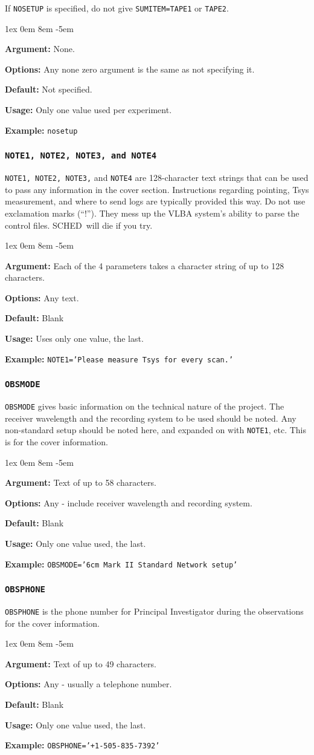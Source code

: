 \documentclass{report}
\newcommand{\schedb}{{\sc SCHED~}}
\newcommand{\rcwbox}[5]{
  \begin{list}{}{\parsep 1ex  \itemsep 0em
                 \leftmargin 8em  \itemindent -5em }
    \item {\bf Argument:} #1
    \item {\bf Options:}  #2
    \item {\bf Default:}  #3
    \item {\bf Usage:}    #4
    \item {\bf Example:}  #5
  \end{list}
}
\begin{document}
If {\tt NOSETUP} is specified, do not give {\tt SUMITEM=TAPE1} or
{\tt TAPE2}.

\rcwbox
{None.}
{Any none zero argument is the same as not specifying it.}
{Not specified.}
{Only one value used per experiment.}
{{\tt nosetup}}

\subsubsection{\label{MP:NOTE1}{\tt NOTE1, NOTE2, NOTE3, and NOTE4}}

{\tt NOTE1, NOTE2, NOTE3,} and {\tt NOTE4} are 128-character text strings that
can be used to pass any information in the cover section. Instructions
regarding pointing, Tsys measurement, and where to send logs are typically
provided this way.  Do not use exclamation marks (``!'').  They mess up
the VLBA system's ability to parse the control files.  \schedb will die
if you try.

\rcwbox
{Each of the 4 parameters takes a character string of up to 128
characters.}
{Any text.}
{Blank}
{Uses only one value, the last.}
{{\tt NOTE1='Please measure Tsys for every scan.'}}


\subsubsection{\label{MP:OBSMODE}{\tt OBSMODE}}

{\tt OBSMODE} gives basic information on the technical nature of
the project. The receiver wavelength and the recording system to be
used should be noted. Any non-standard setup should be noted here, and
expanded on with {\tt NOTE1}, etc.  This is for the cover information.

\rcwbox
{Text of up to 58 characters.}
{Any - include receiver wavelength and recording system.}
{Blank}
{Only one value used, the last.}
{{\tt OBSMODE='6cm  Mark II  Standard Network setup'}}


\subsubsection{\label{MP:OBSPHONE}{\tt OBSPHONE}}

{\tt OBSPHONE} is the phone number for Principal Investigator during
the observations for the cover information.

\rcwbox
{Text of up to 49 characters.}
{Any - usually a telephone number.}
{Blank}
{Only one value used, the last.}
{{\tt OBSPHONE='+1-505-835-7392'}}
\end{document}
